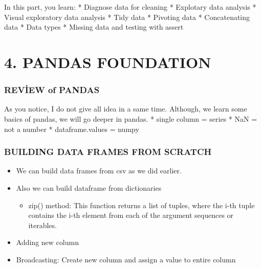 \documentclass[11pt]{article}
\providecommand{\tightlist}{%
      \setlength{\itemsep}{0pt}\setlength{\parskip}{0pt}}
\begin{document}
    In this part, you learn: * Diagnose data for cleaning * Explotary data
analysis * Visual exploratory data analysis * Tidy data * Pivoting data
* Concatenating data * Data types * Missing data and testing with assert

    \hypertarget{pandas-foundation}{%
\section{4. PANDAS FOUNDATION}\label{pandas-foundation}}

    \hypertarget{review-of-pandas}{%
\subsubsection{REVİEW of PANDAS}\label{review-of-pandas}}

As you notice, I do not give all idea in a same time. Although, we learn
some basics of pandas, we will go deeper in pandas. * single column =
series * NaN = not a number * dataframe.values = numpy

    \hypertarget{building-data-frames-from-scratch}{%
\subsubsection{BUILDING DATA FRAMES FROM
SCRATCH}\label{building-data-frames-from-scratch}}

\begin{itemize}
\tightlist
\item
  We can build data frames from csv as we did earlier.
\item
  Also we can build dataframe from dictionaries

  \begin{itemize}
  \tightlist
  \item
    zip() method: This function returns a list of tuples, where the i-th
    tuple contains the i-th element from each of the argument sequences
    or iterables.
  \end{itemize}
\item
  Adding new column
\item
  Broadcasting: Create new column and assign a value to entire column
\end{itemize}
\end{document}
